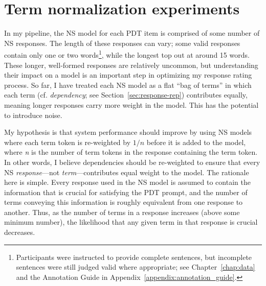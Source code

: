\section{Term normalization experiments}
\label{sec:exp-term-norm}

In my pipeline, the NS model for each PDT item is comprised of some number of NS responses.  The length of these responses can vary; some valid responses contain only one or two words\footnote{Participants were instructed to provide complete sentences, but incomplete sentences were still judged valid where appropriate; see Chapter~\ref{chap:data} and the Annotation Guide in Appendix~\ref{appendix:annotation_guide}.}, while the longest top out at around 15 words. These longer, well-formed responses are relatively uncommon, but understanding their impact on a model is an important step in optimizing my response rating process. So far, I have treated each NS model as a flat ``bag of terms'' in which each term (cf. \textit{dependency}; see Section~\ref{sec:response-rep}) contributes equally, meaning longer responses carry more weight in the model. This has the potential to introduce noise. 

My hypothesis is that system performance should improve by using NS models where each term token is re-weighted by $1/\textit{n}$ before it is added to the model, where \textit{n} is the number of term tokens in the response containing the term token. In other words, I believe dependencies should be re-weighted to ensure that every NS \textit{response}---not \textit{term}---contributes equal weight to the model. The rationale here is simple. Every response used in the NS model is assumed to contain the information that is crucial for satisfying the PDT prompt, and the number of terms conveying this information is roughly equivalent from one response to another. Thus, as the number of terms in a response increases (above some minimum number), the likelihood that any given term in that response is crucial decreases.


